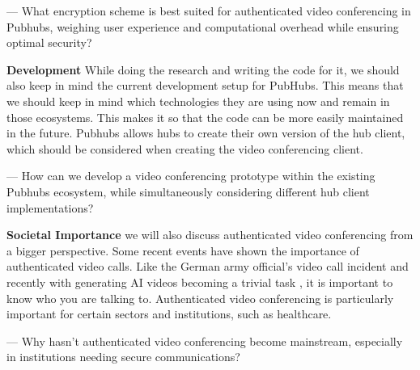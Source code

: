 \documentclass[11pt,a4paper]{article}
\begin{document}
— What encryption scheme is best suited for authenticated video conferencing in Pubhubs, weighing user experience and computational overhead while ensuring optimal security? 

\textbf{Development}
While doing the research and writing the code for it, we should also keep in mind the current development setup for PubHubs. This means that we should keep in mind which technologies they are using now and remain in those ecosystems. This makes it so that the code can be more easily maintained in the future. Pubhubs allows hubs to create their own version of the hub client, which should be considered when creating the video conferencing client.

— How can we develop a video conferencing prototype within the existing Pubhubs ecosystem, while simultaneously considering different hub client implementations?

\textbf{Societal Importance}
we will also discuss authenticated video conferencing from a bigger perspective. Some recent events have shown the importance of authenticated video calls. Like the German army official's video call incident \cite{GERMAN} and recently with generating AI videos becoming a trivial task \cite{SORA}\cite{HEYGEN}, it is important to know who you are talking to. Authenticated video conferencing is particularly important for certain sectors and institutions, such as healthcare. 

— Why hasn't authenticated video conferencing become mainstream, especially in institutions needing secure communications?



\end{document}
